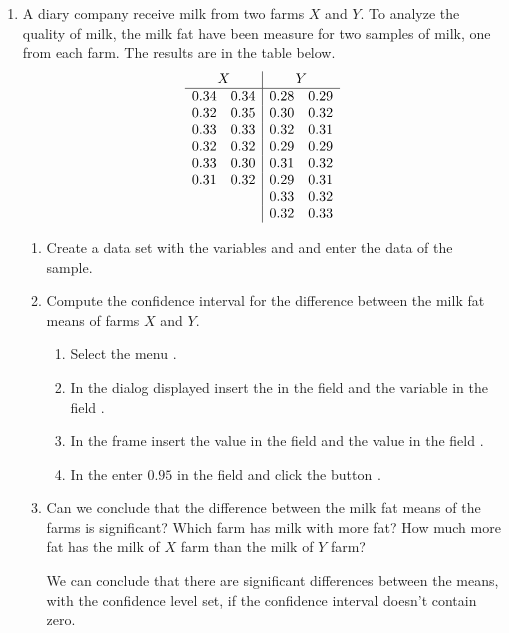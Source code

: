 \begin{enumerate}[leftmargin=*]
\item A diary company receive milk from two farms $X$ and $Y$.
To analyze the quality of milk, the milk fat have been measure for two samples of milk, one from each farm.
The results are in the table below. 
\[
\begin{array}{ll|ll}
\multicolumn{2}{c|}{X} & \multicolumn{2}{c}{Y} \\
\hline
0.34 & 0.34 & 0.28 & 0.29 \\
0.32 & 0.35 & 0.30 & 0.32 \\
0.33 & 0.33 & 0.32 & 0.31 \\
0.32 & 0.32 & 0.29 & 0.29 \\
0.33 & 0.30 & 0.31 & 0.32 \\
0.31 & 0.32 & 0.29 & 0.31 \\
 &  & 0.33 & 0.32 \\
 &  & 0.32 & 0.33 \\
\end{array}
\]

\begin{enumerate}
\item Create a data set with the variables  and  and enter the data of the sample.
\item Compute the confidence interval for the difference between the milk fat means of farms $X$ and $Y$.  
\begin{indication}
\begin{enumerate}
\item Select the menu .
\item In the dialog displayed insert the  in the field  and the variable
 in the field .
\item In the frame  insert the value  in the field  and the
value  in the field .
\item In the  enter $0.95$ in the field  and click the button
.
\end{enumerate}
\end{indication}

\item Can we conclude that the difference between the milk fat means of the farms is significant? 
Which farm has milk with more fat?
How much more fat has the milk of $X$ farm than the milk of $Y$ farm? 
\begin{indication}
We can conclude that there are significant differences between the means, with the confidence level set, if the
confidence interval doesn't contain zero. 
\end{indication}
\end{enumerate}



\end{enumerate}
